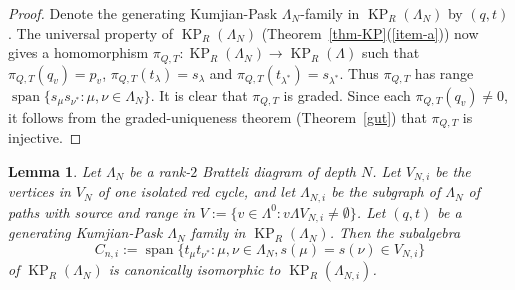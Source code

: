\documentclass[a4paper,12pt]{amsart}
\numberwithin{equation}{section}
\newtheorem{lemma}[thm]{Lemma}
\theoremstyle{definition}
\theoremstyle{remark}
\begin{document}
\begin{proof}
Denote the generating Kumjian-Pask $\Lambda_N$-family in $\operatorname{KP}_R(\Lambda_N)$ by $(q, t)$.  The universal property of $\operatorname{KP}_R(\Lambda_N)$ (Theorem~\ref{thm-KP}(\ref{item-a})) now gives a homomorphism $\pi_{Q,T}:\operatorname{KP}_R(\Lambda_N)\to \operatorname{KP}_R(\Lambda)$ such that $\pi_{Q,T}(q_v)=p_v$, $\pi_{Q,T}(t_\lambda)=s_\lambda$ and $\pi_{Q,T}(t_{\lambda^*})=s_{\lambda^*}$.  Thus $\pi_{Q,T}$ has range ${\operatorname{\mathrm{span}}}\{s_\mu s_{\nu^*}:\mu,\nu\in\Lambda_N\}$.
It is clear that $\pi_{Q,T}$ is graded. Since each $\pi_{Q,T}(q_v)\neq 0$, it follows from the graded-uniqueness theorem (Theorem~\ref{gut}) that $\pi_{Q,T}$ is injective.
\end{proof}

\begin{lemma}\label{break-up}  Let $\Lambda_N$ be a rank-$2$ Bratteli diagram of depth $N$.
Let $V_{N,i}$ be the vertices in $V_N$ of one isolated red cycle, and let $\Lambda_{N,i}$ be the subgraph of $\Lambda_N$ of paths with source and range in $V:=\{v\in \Lambda^{0}: v\Lambda V_{N,i}\neq \emptyset\}$. Let $(q,t)$ be a generating Kumjian-Pask $\Lambda_N$ family in $\operatorname{KP}_R(\Lambda_N)$. Then the subalgebra \[C_{n,i}:={\operatorname{\mathrm{span}}}\{t_\mu t_{\nu^*}:\mu,\nu\in\Lambda_N, s(\mu)=s(\nu)\in V_{N,i}\}\] of $\operatorname{KP}_R(\Lambda_N)$ is canonically isomorphic to $\operatorname{KP}_R(\Lambda_{N,i})$.
\end{lemma}
\end{document}
